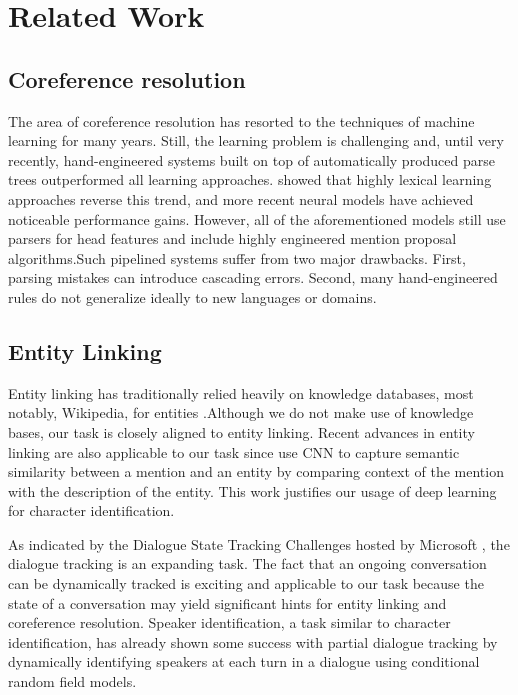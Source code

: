 \documentclass[11pt]{article}
\begin{document}
\section{Related Work}
\subsection{Coreference resolution}
The area of coreference resolution has resorted to the techniques of machine learning for many years. Still, the learning problem is challenging and, until very recently, hand-engineered systems built on top of automatically produced parse trees \cite{Raghunathan:2010:MSC:1870658.1870706} outperformed all learning approaches.\cite{Durrett2013EasyVA} showed that highly lexical learning approaches reverse this trend, and more recent neural models\cite{2016arXiv160403035W,2016arXiv160908667C,2016arXiv160601323C} have achieved noticeable performance gains. However, all of the aforementioned models still use parsers for head features and include highly engineered mention proposal algorithms.Such pipelined systems suffer from two major drawbacks. First, parsing mistakes can introduce cascading errors. Second, many hand-engineered rules do not generalize ideally to new languages or domains.  

\subsection{Entity Linking}

Entity linking has traditionally relied heavily on knowledge databases, most notably, Wikipedia, for entities 
\cite{Mihalcea:2007:WLD:1321440.1321475,2016arXiv160400734F}.Although we do not make use of knowledge bases, our task is closely aligned to entity linking. Recent advances in entity linking are also applicable to our task since \cite{2016arXiv160400734F} use CNN to capture semantic similarity between a mention and an entity by comparing context of the mention with the description of the entity. This work justifies our usage of deep learning for character identification.

As indicated by the Dialogue State Tracking Challenges hosted by Microsoft  \cite{Fourth}, the dialogue tracking is an expanding task. The fact that an ongoing conversation can be dynamically tracked \cite{henderson-thomson-young:2013:SIGDIAL}is exciting and applicable to our task because the state of a conversation may yield significant hints for entity linking and coreference resolution. Speaker identification, a task similar to character identification, has already shown some success with partial dialogue tracking by dynamically identifying speakers at each turn in a dialogue using conditional random field models.
\end{document}
